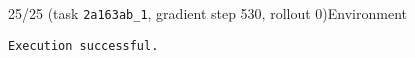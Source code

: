 \hspace*{8mm}%
\begin{minipage}{0.95\linewidth}
\begin{user_message_box}{{25/25 (task \texttt{2a163ab\_1}, gradient step 530, rollout 0)\hfill Environment}}
\scriptsize
\begin{Verbatim}[breaklines]
Execution successful.
\end{Verbatim}
\end{user_message_box}
\end{minipage}